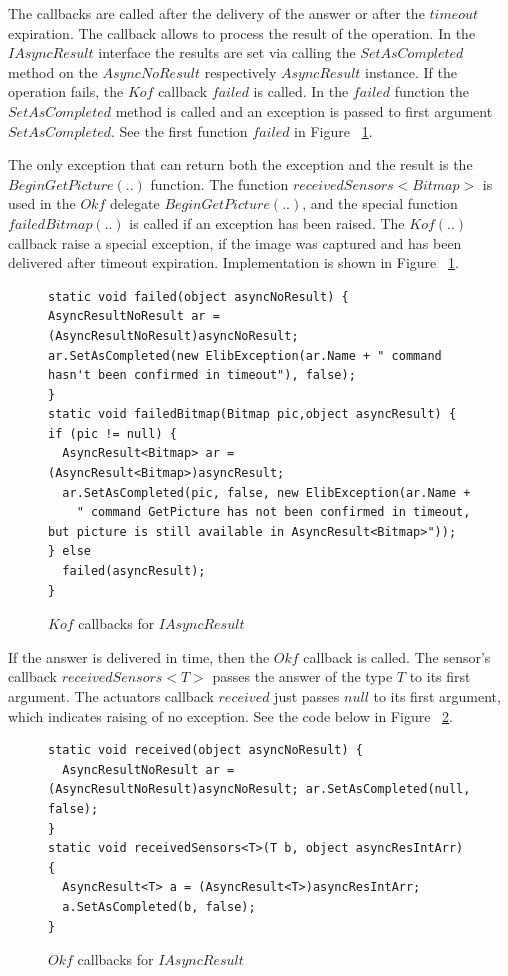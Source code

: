   The callbacks are called after the delivery of the answer or after the $timeout$ expiration.
  The callback allows to process the result of the operation.
  In the $IAsyncResult$ interface the results are set via calling the $SetAsCompleted$ method 
  on the $AsyncNoResult$ respectively $AsyncResult$ instance.
  If the operation fails, the $Kof$ callback $failed$ is called. 
  In the $failed$ function the $SetAsCompleted$ method is called and an exception is passed to first argument $SetAsCompleted$.
  See the first function $failed$ in Figure ~\ref{Ikofs}.

  The only exception that can return both the exception and the result is the $BeginGetPicture(..)$ function.
  The function $receivedSensors<Bitmap>$ is used in the $Okf$ delegate $BeginGetPicture(..)$, and 
  the special function $failedBitmap(..)$ is called if an exception has been raised.
  The $Kof(..)$ callback raise a special exception, if the image was captured and has been 
  delivered after timeout expiration.
  Implementation is shown in Figure ~\ref{Ikofs}. 

  
\begin{figure}[!hbp]
\begin{lstlisting}
static void failed(object asyncNoResult) {
AsyncResultNoResult ar = (AsyncResultNoResult)asyncNoResult;
ar.SetAsCompleted(new ElibException(ar.Name + " command hasn't been confirmed in timeout"), false); 
}
static void failedBitmap(Bitmap pic,object asyncResult) {
if (pic != null) {
  AsyncResult<Bitmap> ar = (AsyncResult<Bitmap>)asyncResult;        
  ar.SetAsCompleted(pic, false, new ElibException(ar.Name + 
    " command GetPicture has not been confirmed in timeout, but picture is still available in AsyncResult<Bitmap>"));
} else
  failed(asyncResult);
}
\end{lstlisting}	
\caption{$Kof$ callbacks for $IAsyncResult$} \label{Ikofs}
\end{figure}


  If the answer is delivered in time, then the $Okf$ callback is called.
  The sensor's callback $receivedSensors<T>$ passes the answer of the type $T$ to its first argument.
  The actuators callback $received$ just passes $null$ to its first argument, which indicates
  raising of no exception.
  See the code below in Figure ~\ref{Iokfs}.


\begin{figure}[!hbp]
\begin{lstlisting}
static void received(object asyncNoResult) {
  AsyncResultNoResult ar = (AsyncResultNoResult)asyncNoResult; ar.SetAsCompleted(null, false); 
}
static void receivedSensors<T>(T b, object asyncResIntArr) {
  AsyncResult<T> a = (AsyncResult<T>)asyncResIntArr;
  a.SetAsCompleted(b, false);
}
\end{lstlisting}	
\caption{$Okf$ callbacks for $IAsyncResult$} \label{Iokfs}
\end{figure}

